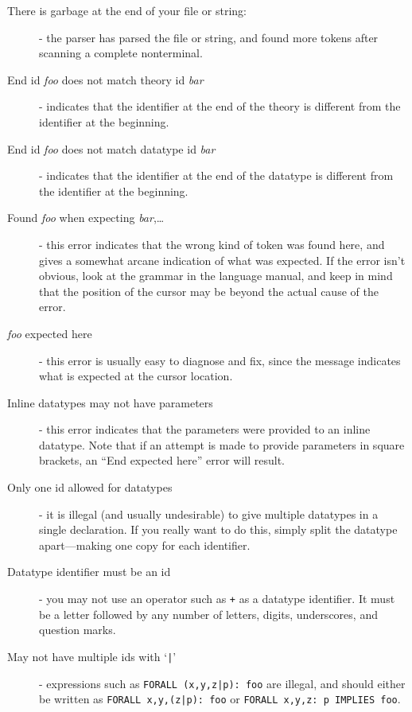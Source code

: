 \begin{description}

\item[There is garbage at the end of your file or string:] - the parser
has parsed the file or string, and found more tokens after scanning a
complete nonterminal.

\item[End id {\em foo\/} does not match theory id {\em bar\/}] - indicates
that the identifier at the end of the theory is different from the
identifier at the beginning.

\item[End id {\em foo\/} does not match datatype id {\em bar\/}] -
indicates that the identifier at the end of the datatype is different from
the identifier at the beginning.

\item[Found \emph{foo} when expecting \emph{bar},\ldots] - this error
indicates that the wrong kind of token was found here, and gives a
somewhat arcane indication of what was expected.  If the error isn't
obvious, look at the grammar in the language manual, and keep in mind that
the position of the cursor may be beyond the actual cause of the error.

\item[\emph{foo} expected here] - this error is usually easy to diagnose
and fix, since the message indicates what is expected at the cursor
location.

\item[Inline datatypes may not have parameters] - this error indicates
that the parameters were provided to an inline datatype.  Note that if an
attempt is made to provide parameters in square brackets, an ``End
expected here'' error will result.

\item[Only one id allowed for datatypes] - it is illegal (and usually
undesirable) to give multiple datatypes in a single declaration.  If you
really want to do this, simply split the datatype apart---making one copy
for each identifier.

\item[Datatype identifier must be an id] - you may not use an operator
such as \texttt{+} as a datatype identifier.  It must be a letter followed
by any number of letters, digits, underscores, and question marks.

\item[May not have multiple ids with `\texttt{|}'] - expressions such as
\texttt{FORALL (x,y,z|p):\ foo} are illegal, and should either be written
as \texttt{FORALL x,y,(z|p):\ foo} or \texttt{FORALL x,y,z:\ p IMPLIES foo}.


\end{description}
